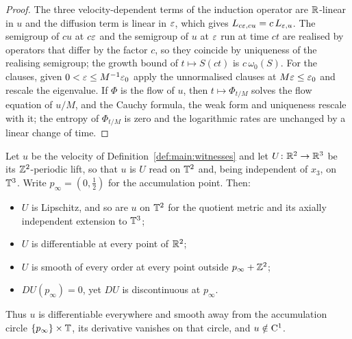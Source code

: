 \begin{proof}
  \leanok
  The three velocity-dependent terms of the induction operator are $\mathbb{R}$-linear in $u$ and the
  diffusion term is linear in $\varepsilon$, which gives $L_{c\varepsilon,cu}=c\,L_{\varepsilon,u}$.  The semigroup
  of $cu$ at $c\varepsilon$ and the semigroup of $u$ at $\varepsilon$ run at time $ct$ are realised by
  operators that differ by the factor $c$, so they coincide by uniqueness of the realising
  semigroup; the growth bound of $t\mapsto S(ct)$ is $c\,\omega_0(S)$.  For the clauses, given
  $0<\varepsilon\leq M^{-1}\varepsilon_0$ apply the unnormalised clauses at $M\varepsilon\leq\varepsilon_0$ and rescale
  the eigenvalue.  If $\Phi$ is the flow of $u$, then $t\mapsto\Phi_{t/M}$ solves the flow
  equation of $u/M$, and the Cauchy formula, the weak form and uniqueness rescale with it; the
  entropy of $\Phi_{t/M}$ is zero and the logarithmic rates are unchanged by a linear change of
  time.
\end{proof}

\begin{lemma}
  \label{lem:main:velocity-regularity}
  \leanok
  Let $u$ be the velocity of Definition~\ref{def:main:witnesses} and let
  $U\colon\mathbb{R}^2\to\mathbb{R}^3$ be its $\mathbb{Z}^2$-periodic lift, so that $u$ is $U$ read on
  $\mathbb{T}^2$ and, being independent of $x_3$, on $\mathbb{T}^3$.  Write
  $p_\infty=(0,\tfrac12)$ for the accumulation point.  Then:
  \begin{itemize}
    \item $U$ is Lipschitz, and so are $u$ on $\mathbb{T}^2$ for the quotient metric
      and its axially independent extension to $\mathbb{T}^3$;
    \item $U$ is differentiable at every point of $\mathbb{R}^2$;
    \item $U$ is smooth of every order at every point outside
      $p_\infty+\mathbb{Z}^2$;
    \item $DU(p_\infty)=0$, yet $DU$ is discontinuous at $p_\infty$.
  \end{itemize}
  Thus $u$ is differentiable everywhere and smooth away from the accumulation
  circle $\{p_\infty\}\times\mathbb{T}$, its derivative vanishes on that circle, and
  $u\notin\mathrm{C}^1$.
\end{lemma}

